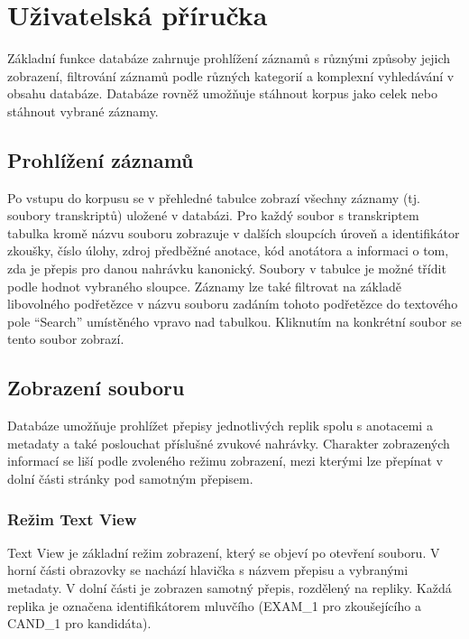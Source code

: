 \documentclass[
]{article}
\author{}
\date{}
\begin{document}
\hypertarget{uux17eivatelskuxe1-pux159uxedruux10dka}{%
\section{Uživatelská
příručka}\label{uux17eivatelskuxe1-pux159uxedruux10dka}}

Základní funkce databáze zahrnuje prohlížení záznamů s různými způsoby
jejich zobrazení, filtrování záznamů podle různých kategorií a komplexní
vyhledávání v obsahu databáze. Databáze rovněž umožňuje stáhnout korpus
jako celek nebo stáhnout vybrané záznamy.

\hypertarget{prohluxedux17eenuxed-zuxe1znamux16f}{%
\subsection{Prohlížení
záznamů}\label{prohluxedux17eenuxed-zuxe1znamux16f}}

Po vstupu do korpusu se v přehledné tabulce zobrazí všechny záznamy (tj.
soubory transkriptů) uložené v databázi. Pro každý soubor s transkriptem
tabulka kromě názvu souboru zobrazuje v dalších sloupcích úroveň a
identifikátor zkoušky, číslo úlohy, zdroj předběžné anotace, kód
anotátora a informaci o tom, zda je přepis pro danou nahrávku kanonický.
Soubory v tabulce je možné třídit podle hodnot vybraného sloupce.
Záznamy lze také filtrovat na základě libovolného podřetězce v názvu
souboru zadáním tohoto podřetězce do textového pole ``Search''
umístěného vpravo nad tabulkou. Kliknutím na konkrétní soubor se tento
soubor zobrazí.

\hypertarget{zobrazenuxed-souboru}{%
\subsection{Zobrazení souboru}\label{zobrazenuxed-souboru}}

Databáze umožňuje prohlížet přepisy jednotlivých replik spolu s
anotacemi a metadaty a také poslouchat příslušné zvukové nahrávky.
Charakter zobrazených informací se liší podle zvoleného režimu
zobrazení, mezi kterými lze přepínat v dolní části stránky pod samotným
přepisem.

\hypertarget{reux17eim-text-view}{%
\subsubsection{Režim Text View}\label{reux17eim-text-view}}

Text View je základní režim zobrazení, který se objeví po otevření
souboru. V horní části obrazovky se nachází hlavička s názvem přepisu a
vybranými metadaty. V dolní části je zobrazen samotný přepis, rozdělený
na repliky. Každá replika je označena identifikátorem mluvčího (EXAM\_1
pro zkoušejícího a CAND\_1 pro kandidáta).
\end{document}
